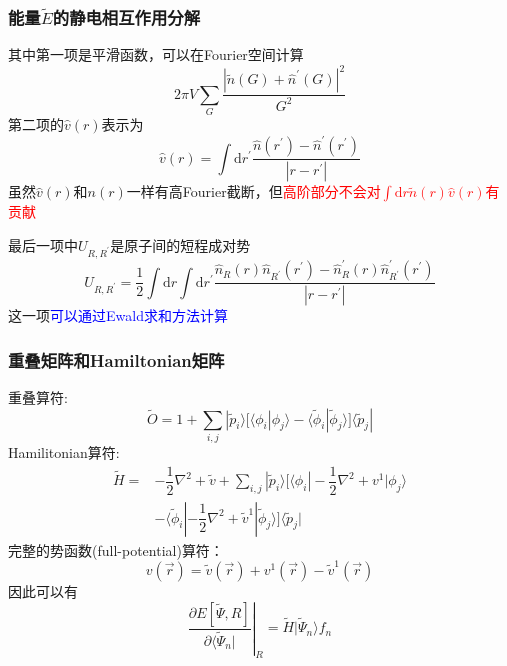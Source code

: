\frame
{
	\frametitle{能量$\tilde E$的静电相互作用分解}
	其中第一项是平滑函数，可以在\textrm{Fourier}空间计算
	$$2\pi V\sum_G\dfrac{|\tilde n(G)+\hat n^{\prime}(G)|^2}{G^2}$$
	第二项的$\hat v(r)$表示为
	$$\hat v(r)=\int\mathrm{d}r^{\prime}\dfrac{\hat n(r^{\prime})-\hat n^{\prime}(r^{\prime})}{|r-r^{\prime}|}$$
	虽然$\hat v(r)$和$n(r)$一样有高\textrm{Fourier}截断，但\textcolor{red}{高阶部分不会对$\int\mathrm{d}r\tilde n(r)\hat v(r)$有贡献}

	最后一项中$U_{R,R^{\prime}}$是原子间的短程成对势
	$$U_{R,R^{\prime}}=\dfrac12\int\mathrm{d}r\int\mathrm{d}r^{\prime}\dfrac{\hat n_R(r)\hat n_{R^{\prime}}(r^{\prime})-\hat n_R^{\prime}(r)\hat n_{R^{\prime}}^{\prime}(r^{\prime})}{|r-r^{\prime}|}$$
	这一项\textcolor{blue}{可以通过\textrm{Ewald}求和方法计算}
}

\frame
{
	\frametitle{重叠矩阵和\textrm{Hamiltonian}矩阵}
重叠算符:
$$\tilde O=1+\sum_{i,j}|\tilde p_i\rangle\bigg[\langle\phi_i|\phi_j\rangle-\langle\tilde\phi_i|\tilde\phi_j\rangle\bigg]\langle\tilde p_j|$$
\textrm{Hamilitonian}算符:
\begin{displaymath}
	\begin{aligned}
		\tilde H=&-\dfrac12\nabla^2+\tilde v+\sum_{i,j}|\tilde p_i\rangle\bigg[\langle\phi_i|-\dfrac12\nabla^2+v^1|\phi_j\rangle\\
			&-\langle\tilde\phi_i|-\dfrac12\nabla^2+\tilde v^1|\tilde\phi_j\rangle\bigg]\langle\tilde p_j| 
	\end{aligned}
\end{displaymath}
	完整的势函数\textrm{(full-potential)}算符：
$$v(\vec r)=\tilde v(\vec r)+v^1(\vec r)-\tilde v^1(\vec r)$$
因此可以有
$$\left.\dfrac{\partial E[\tilde\Psi, R]}{\partial\langle\tilde\Psi_n|}\right|_R=\tilde H|\tilde\Psi_n\rangle f_n$$
}

